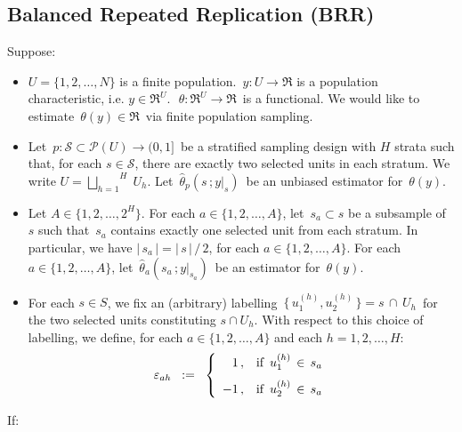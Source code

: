 

\subsection{Balanced Repeated Replication (BRR)}

\vskip 0.2cm
\begin{proposition}
\mbox{}\vskip 0.1cm
\noindent
Suppose:
\begin{itemize}
\item
	$U = \{1,2,\ldots,N\}$\; is a finite population.
	\,$y : U \longrightarrow \Re$\; is a population characteristic, i.e. \;$y \in \Re^{U}$.\,
	\,$\theta : \Re^{U} \longrightarrow \Re$\, is a functional.
	We would like to estimate \,$\theta(y) \in \Re$\, via finite population sampling.
\item
	Let \,$p : \mathcal{S} \subset \mathcal{P}(U) \longrightarrow (0,1]$\, be a stratified
	sampling design with $H$ strata such that, for each $s \in \mathcal{S}$, there are
	exactly two selected units in each stratum.
	We write $U = \overset{H}{\underset{h = 1}{\bigsqcup}}\;U_{h}$.
	Let \,$\widehat{\theta}_{p}(s\,;y\vert_{s})$\, be an unbiased estimator for \,$\theta(y)$.
\item
	Let $A \in \{1,2,\ldots,2^{H}\}$.
	For each $a \in \{1,2,\ldots,A\}$, let \,$s_{a} \subset s$ be a subsample of $s$
	such that \,$s_{a}$ contains exactly one selected unit from each stratum.
	In particular, we have $\vert\,s_{a}\,\vert = \vert\,s\,\vert\,/\,2$, for each $a \in \{1,2,\ldots,A\}$.
	For each $a \in \{1,2,\ldots,A\}$, let \,$\widehat{\theta}_{a}(s_{a}\,;y\vert_{s_{a}})$\, be an
	estimator for \,$\theta(y)$.	
\item
	For each $s \in S$, we fix an (arbitrary) labelling
	\,$\{\,u^{(h)}_{1}, u^{(h)}_{2}\,\} = s \,\cap\, U_{h}$\,
	for the two selected units constituting $s \cap U_{h}$.
	With respect to this choice of labelling, we define,
	for each $a \in \{1,2,\ldots,A\}$ and each $h = 1,2,\ldots,H$:
	\begin{equation*}
	\varepsilon_{ah}
	\;\; := \;\;
		\left\{\begin{array}{rl}
			1\,, & \textnormal{if \,$u^{(h)}_{1} \,\in\, s_{a}$}
			\\
			-1\,, & \overset{{\color{white}-}}{\textnormal{if \,$u^{(h)}_{2} \,\in\, s_{a}$}}
			\end{array}\right.
	\end{equation*}
\end{itemize}
If:
\begin{enumerate}

\end{enumerate}
\end{proposition}
